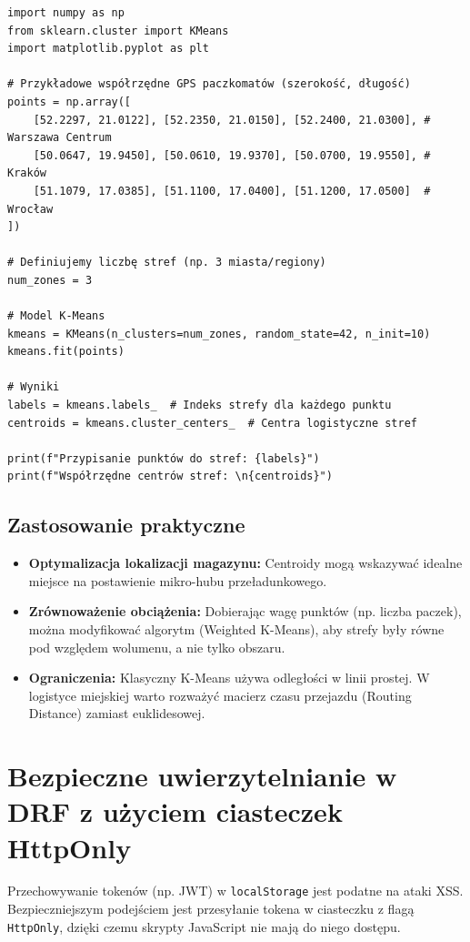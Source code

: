 \begin{verbatim}
import numpy as np
from sklearn.cluster import KMeans
import matplotlib.pyplot as plt

# Przykładowe współrzędne GPS paczkomatów (szerokość, długość)
points = np.array([
    [52.2297, 21.0122], [52.2350, 21.0150], [52.2400, 21.0300], # Warszawa Centrum
    [50.0647, 19.9450], [50.0610, 19.9370], [50.0700, 19.9550], # Kraków
    [51.1079, 17.0385], [51.1100, 17.0400], [51.1200, 17.0500]  # Wrocław
])

# Definiujemy liczbę stref (np. 3 miasta/regiony)
num_zones = 3

# Model K-Means
kmeans = KMeans(n_clusters=num_zones, random_state=42, n_init=10)
kmeans.fit(points)

# Wyniki
labels = kmeans.labels_  # Indeks strefy dla każdego punktu
centroids = kmeans.cluster_centers_  # Centra logistyczne stref

print(f"Przypisanie punktów do stref: {labels}")
print(f"Współrzędne centrów stref: \n{centroids}")
\end{verbatim}

\subsection*{Zastosowanie praktyczne}

\begin{itemize}
    \item \textbf{Optymalizacja lokalizacji magazynu:} Centroidy mogą wskazywać idealne miejsce na postawienie mikro-hubu przeładunkowego.
    \item \textbf{Zrównoważenie obciążenia:} Dobierając wagę punktów (np. liczba paczek), można modyfikować algorytm (Weighted K-Means), aby strefy były równe pod względem wolumenu, a nie tylko obszaru.
    \item \textbf{Ograniczenia:} Klasyczny K-Means używa odległości w linii prostej. W logistyce miejskiej warto rozważyć macierz czasu przejazdu (Routing Distance) zamiast euklidesowej.
\end{itemize}

\section{Bezpieczne uwierzytelnianie w DRF z użyciem ciasteczek HttpOnly}

Przechowywanie tokenów (np. JWT) w \texttt{localStorage} jest podatne na ataki XSS. Bezpieczniejszym podejściem jest przesyłanie tokena w ciasteczku z flagą \texttt{HttpOnly}, dzięki czemu skrypty JavaScript nie mają do niego dostępu.

